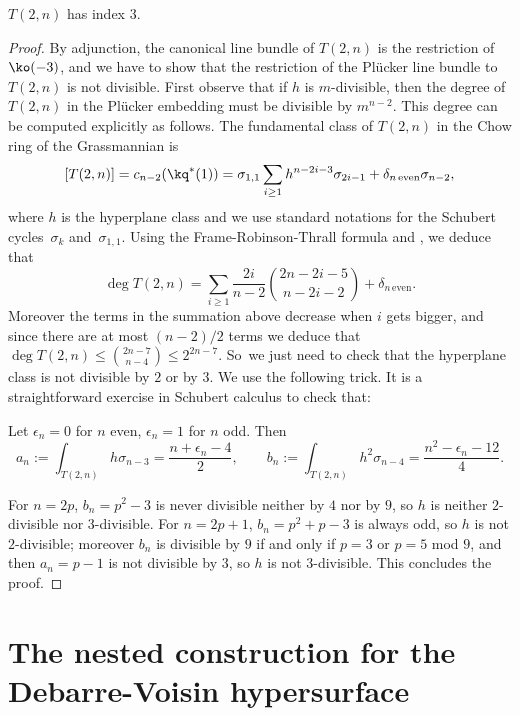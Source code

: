 \begin{prop} $T(2,n)$ has index $3$. \end{prop}

\begin{proof}
By adjunction, the canonical line bundle of $T(2,n)$ is the restriction of
$\ko(-3)$, and we have to show that the restriction of the Plücker line
bundle to $T(2,n)$ is not divisible. First observe that if $h$ is $m$-divisible,
then the degree of $T(2,n)$ in the Plücker embedding must be divisible by
$m^{n-2}$. This degree can be computed explicitly as follows. The fundamental class
of $T(2,n)$ in the Chow ring of the Grassmannian is
\[
[T(2,n)]=c_{n-2}(\kq^*(1))=\sigma_{1,1}\sum_{i\ge 1}h^{n-2i-3}\sigma_{2i-1}+\delta_{n\,\text{even}}\sigma_{n-2},
\]
where $h$ is the hyperplane class and we use standard notations for the Schubert cycles~$\sigma_k$ and~$\sigma_{1,1}$. Using the Frame-Robinson-Thrall formula and \cite[Cor.\,3.2.14]{schubert}, we deduce that
\[
\deg T(2,n) = \sum_{i\ge 1}\frac{2i}{n-2} \binom{2n-2i-5}{n-2i-2}+\delta_{n\,\text{even}}.
\]
Moreover the terms in the summation above
decrease when $i$ gets bigger, and since there are at most $(n-2)/2$ terms we deduce that
$\deg T(2,n)\le \binom{2n-7}{n-4}\le 2^{2n-7}$. So~we just need to check that the hyperplane class is not divisible by $2$ or by $3$. We use the following trick. It is a straightforward exercise in Schubert calculus to check that:

\begin{lemma} Let $\epsilon_n=0$ for $n$ even, $\epsilon_n=1$ for $n$ odd. Then\vspace*{-3pt}
\[
a_n := \int_{T(2,n)}h\sigma_{n-3}=\frac{n+\epsilon_n-4}{2}, \qquad b_n:=\int_{T(2,n)}h^2\sigma_{n-4}=\frac{n^2-\epsilon_n-12}{4}.
\]
\end{lemma}

For $n=2p$, $b_{n}=p^2-3$ is never divisible neither by $4$ nor by $9$, so $h$ is neither
$2$-divisible nor $3$-divisible. For $n=2p+1$, $b_{n}=p^2+p-3$ is always odd, so $h$ is not
$2$-divisible; moreover $b_n$ is divisible by $9$ if and only if $p=3$ or $p=5$ mod $9$,
and then $a_n=p-1$ is not divisible by $3$, so $h$ is not $3$-divisible. This concludes
the proof.
\end{proof}

\section{The nested construction for the Debarre-Voisin hypersurface}\label{sect:DV}

